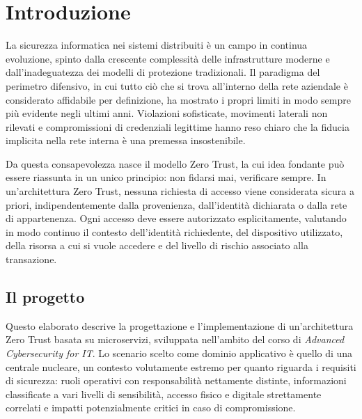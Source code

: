 \chapter{Introduzione}

La sicurezza informatica nei sistemi distribuiti è un campo in continua evoluzione, spinto dalla crescente complessità delle infrastrutture moderne e dall'inadeguatezza dei modelli di protezione tradizionali. Il paradigma del perimetro difensivo, in cui tutto ciò che si trova all'interno della rete aziendale è considerato affidabile per definizione, ha mostrato i propri limiti in modo sempre più evidente negli ultimi anni. Violazioni sofisticate, movimenti laterali non rilevati e compromissioni di credenziali legittime hanno reso chiaro che la fiducia implicita nella rete interna è una premessa insostenibile.

Da questa consapevolezza nasce il modello Zero Trust, la cui idea fondante può essere riassunta in un unico principio: non fidarsi mai, verificare sempre. In un'architettura Zero Trust, nessuna richiesta di accesso viene considerata sicura a priori, indipendentemente dalla provenienza, dall'identità dichiarata o dalla rete di appartenenza. Ogni accesso deve essere autorizzato esplicitamente, valutando in modo continuo il contesto dell'identità richiedente, del dispositivo utilizzato, della risorsa a cui si vuole accedere e del livello di rischio associato alla transazione.

\section{Il progetto}

Questo elaborato descrive la progettazione e l'implementazione di un'architettura Zero Trust basata su microservizi, sviluppata nell'ambito del corso di \textit{Advanced Cybersecurity for IT}. Lo scenario scelto come dominio applicativo è quello di una centrale nucleare, un contesto volutamente estremo per quanto riguarda i requisiti di sicurezza: ruoli operativi con responsabilità nettamente distinte, informazioni classificate a vari livelli di sensibilità, accesso fisico e digitale strettamente correlati e impatti potenzialmente critici in caso di compromissione.

